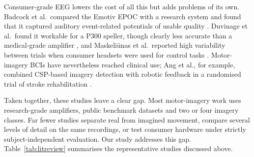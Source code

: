 \documentclass[pdflatex,sn-mathphys-num]{sn-jnl}%
\theoremstyle{thmstyleone}%
\theoremstyle{thmstyletwo}%
\theoremstyle{thmstylethree}%
\begin{document}
Consumer-grade EEG lowers the cost of all this but adds problems of its own. Badcock et al.\ compared the Emotiv EPOC with a research system and found that it captured auditory event-related potentials of usable quality \citep{Badcock2013}. Duvinage et al.\ found it workable for a P300 speller, though clearly less accurate than a medical-grade amplifier \citep{Duvinage2013}, and Maskeli\={u}nas et al.\ reported high variability between trials when consumer headsets were used for control tasks \citep{Maskeliunas2016}. Motor-imagery BCIs have nevertheless reached clinical use; Ang et al., for example, combined CSP-based imagery detection with robotic feedback in a randomised trial of stroke rehabilitation \citep{Ang2015}.

Taken together, these studies leave a clear gap. Most motor-imagery work uses research-grade amplifiers, public benchmark datasets and two or four imagery classes. Far fewer studies separate real from imagined movement, compare several levels of detail on the same recordings, or test consumer hardware under strictly subject-independent evaluation. Our study addresses this gap. Table~\ref{tab:litreview} summarises the representative studies discussed above.
\end{document}
